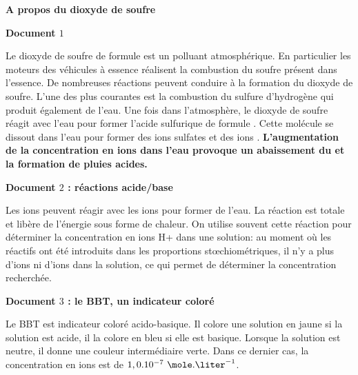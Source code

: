 \vspace{0.3cm}

\exo \textbf{A propos du dioxyde de soufre}

\vspace{0.3cm}

\textbf{Document $1$}

\vspace{0.3cm}

Le dioxyde de soufre de formule  est un polluant atmosphérique. En particulier les moteurs des véhicules à essence réalisent la combustion du soufre présent dans l'essence.
De nombreuses réactions peuvent conduire à la formation du dioxyde de soufre. L'une des plus
courantes est la combustion du sulfure d'hydrogène  qui produit également de l'eau.
Une fois dans l'atmosphère, le dioxyde de soufre réagit avec l'eau pour former l'acide sulfurique de formule . Cette molécule se dissout dans l'eau pour former des ions sulfates  et des ions .\newline
\textbf{L'augmentation de la concentration en ions  dans l'eau provoque un abaissement du  et la formation de pluies acides.}

\vspace{0.3cm}

\textbf{Document $2$ : réactions acide/base}

\vspace{0.3cm}

Les ions  peuvent réagir avec les ions  pour former de l'eau. La réaction est totale et libère de l'énergie sous forme de chaleur. On utilise souvent cette réaction pour déterminer la concentration en ions H+ dans une solution: au moment où les réactifs ont été introduits dans les proportions stœchiométriques, il n'y a plus d'ions  ni d'ions  dans la solution, ce qui permet de déterminer la concentration recherchée.


\newpage

\textbf{Document $3$ : le BBT, un indicateur coloré}

\vspace{0.3cm}

Le BBT est indicateur coloré acido-basique. Il colore une solution en jaune si la solution est acide, il la colore en bleu si elle est basique. Lorsque la solution est neutre, il donne une couleur intermédiaire verte. Dans ce dernier cas, la concentration en ions  est de $1,0 . 10^{-7}\text{ }\mole.\liter^{-1}$.

